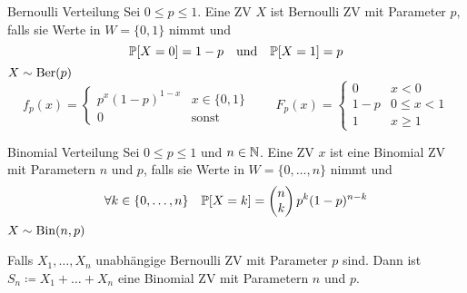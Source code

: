 \begin{definition}{Bernoulli Verteilung}
	Sei $0 \leq p \leq 1$. Eine ZV $X$ ist Bernoulli ZV mit Parameter $p$, falls sie Werte in $W = \{0,1\}$ nimmt und
	\begin{equation*}
		\mathbb{P} [X = 0] = 1-p \quad\text{und}\quad \mathbb{P} [X = 1] = p
	\end{equation*}
	$ X \sim \text{Ber} (p)$
	\begin{equation*}
		f_p (x) =
		\begin{cases}
			p^x (1-p)^{1-x} & x \in \{0,1\}\\
			0 & \text{sonst}
		\end{cases}
		\qquad
		F_p (x) =
		\begin{cases}
			0 & x < 0\\
			1-p & 0 \leq x < 1\\
			1 & x \geq 1
		\end{cases}
	\end{equation*}
\end{definition}
\begin{definition}{Binomial Verteilung}
	Sei $ 0 \leq p \leq 1$ und $n \in \mathbb{N}$. Eine ZV $x$ ist eine Binomial ZV mit Parametern $n$ und $p$, falls sie Werte
	in $W = \{0 , \ldots , n\}$ nimmt und
	\begin{equation*}
		\forall k \in \{0 , \ldots , n\} \quad \mathbb{P} [X = k] = \begin{pmatrix}n\\k\end{pmatrix} p^k (1-p)^{n-k}
	\end{equation*}
	$X \sim \text{Bin} (n,p)$
\end{definition}
Falls $X_1 , \ldots , X_n$ unabhängige Bernoulli ZV mit Parameter $p$ sind. Dann ist $S_n \coloneqq X_1 + \ldots + X_n$
eine Binomial ZV mit Parametern $n$ und $p$.

